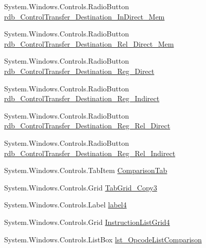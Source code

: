 \begin{DoxyCompactItemize}
\item 
System.\+Windows.\+Controls.\+Radio\+Button \hyperlink{class_c_p_u___o_s___simulator_1_1_instructions_window_a3e7c3a4af8ca006ee301f7d75e60fea9}{rdb\+\_\+\+Control\+Transfer\+\_\+\+Destination\+\_\+\+In\+Direct\+\_\+\+Mem}
\item 
System.\+Windows.\+Controls.\+Radio\+Button \hyperlink{class_c_p_u___o_s___simulator_1_1_instructions_window_a9fa1a2733061aa2e0f2ae8beb1c6c419}{rdb\+\_\+\+Control\+Transfer\+\_\+\+Destination\+\_\+\+Rel\+\_\+\+Direct\+\_\+\+Mem}
\item 
System.\+Windows.\+Controls.\+Radio\+Button \hyperlink{class_c_p_u___o_s___simulator_1_1_instructions_window_ae225de59498479764ef7ec27204a7366}{rdb\+\_\+\+Control\+Transfer\+\_\+\+Destination\+\_\+\+Reg\+\_\+\+Direct}
\item 
System.\+Windows.\+Controls.\+Radio\+Button \hyperlink{class_c_p_u___o_s___simulator_1_1_instructions_window_a3aa78a60c990282eb5ff0a5e43d7cab7}{rdb\+\_\+\+Control\+Transfer\+\_\+\+Destination\+\_\+\+Reg\+\_\+\+Indirect}
\item 
System.\+Windows.\+Controls.\+Radio\+Button \hyperlink{class_c_p_u___o_s___simulator_1_1_instructions_window_ab13099f39c14e07c23cc0139d3f8cae2}{rdb\+\_\+\+Control\+Transfer\+\_\+\+Destination\+\_\+\+Reg\+\_\+\+Rel\+\_\+\+Direct}
\item 
System.\+Windows.\+Controls.\+Radio\+Button \hyperlink{class_c_p_u___o_s___simulator_1_1_instructions_window_a263fb93d65812e7d21bb205c0e6f917e}{rdb\+\_\+\+Control\+Transfer\+\_\+\+Destination\+\_\+\+Reg\+\_\+\+Rel\+\_\+\+Indirect}
\item 
System.\+Windows.\+Controls.\+Tab\+Item \hyperlink{class_c_p_u___o_s___simulator_1_1_instructions_window_ab807abcf9c3955ae2ff78e1d667820b2}{Comparison\+Tab}
\item 
System.\+Windows.\+Controls.\+Grid \hyperlink{class_c_p_u___o_s___simulator_1_1_instructions_window_a8a50487f6e6acca8a58ffe218e32abe2}{Tab\+Grid\+\_\+\+Copy3}
\item 
System.\+Windows.\+Controls.\+Label \hyperlink{class_c_p_u___o_s___simulator_1_1_instructions_window_a6d028c99fa713c891d86c07ef46f083b}{label4}
\item 
System.\+Windows.\+Controls.\+Grid \hyperlink{class_c_p_u___o_s___simulator_1_1_instructions_window_a9cdd58a2e38d3f0b047b6eb64b43ea03}{Instruction\+List\+Grid4}
\item 
System.\+Windows.\+Controls.\+List\+Box \hyperlink{class_c_p_u___o_s___simulator_1_1_instructions_window_ae47949fa5657e55f8acd8e5b9cd204c0}{lst\+\_\+\+Opcode\+List\+Comparison}

\end{DoxyCompactItemize}
